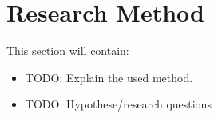 \documentclass[../main.tex]{subfiles}
\begin{document}
    \chapter{Research Method}\label{chap:research_method}
    This section will contain:
    \begin{itemize}[noitemsep,nolistsep]
        \item TODO: Explain the used method. %
        \item TODO: Hypothese/research questions %
    \end{itemize}
    
\end{document}
